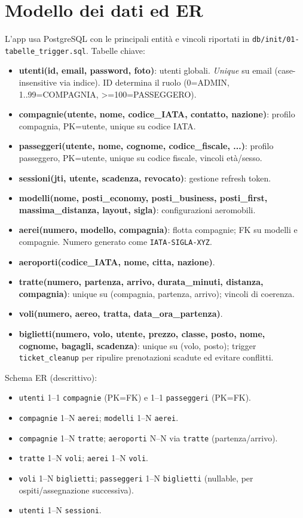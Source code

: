 \documentclass[11pt,a4paper]{article}
\begin{document}
\section{Modello dei dati ed ER}
L'app usa PostgreSQL con le principali entità e vincoli riportati in \texttt{db/init/01-tabelle\_trigger.sql}. Tabelle chiave:
\begin{itemize}
  \item \textbf{utenti(id, email, password, foto)}: utenti globali. \emph{Unique} su email (case-insensitive via indice). ID determina il ruolo (0=ADMIN, 1..99=COMPAGNIA, >=100=PASSEGGERO).
  \item \textbf{compagnie(utente, nome, codice\_IATA, contatto, nazione)}: profilo compagnia, PK=utente, unique su codice IATA.
  \item \textbf{passeggeri(utente, nome, cognome, codice\_fiscale, ...)}: profilo passeggero, PK=utente, unique su codice fiscale, vincoli età/sesso.
  \item \textbf{sessioni(jti, utente, scadenza, revocato)}: gestione refresh token.
  \item \textbf{modelli(nome, posti\_economy, posti\_business, posti\_first, massima\_distanza, layout, sigla)}: configurazioni aeromobili.
  \item \textbf{aerei(numero, modello, compagnia)}: flotta compagnie; FK su modelli e compagnie. Numero generato come \texttt{IATA-SIGLA-XYZ}.
  \item \textbf{aeroporti(codice\_IATA, nome, citta, nazione)}.
  \item \textbf{tratte(numero, partenza, arrivo, durata\_minuti, distanza, compagnia)}: unique su (compagnia, partenza, arrivo); vincoli di coerenza.
  \item \textbf{voli(numero, aereo, tratta, data\_ora\_partenza)}.
  \item \textbf{biglietti(numero, volo, utente, prezzo, classe, posto, nome, cognome, bagagli, scadenza)}: unique su (volo, posto); trigger \texttt{ticket\_cleanup} per ripulire prenotazioni scadute ed evitare conflitti.
\end{itemize}

Schema ER (descrittivo):
\begin{itemize}
  \item \texttt{utenti} 1--1 \texttt{compagnie} (PK=FK) e 1--1 \texttt{passeggeri} (PK=FK).
  \item \texttt{compagnie} 1--N \texttt{aerei}; \texttt{modelli} 1--N \texttt{aerei}.
  \item \texttt{compagnie} 1--N \texttt{tratte}; \texttt{aeroporti} N--N via \texttt{tratte} (partenza/arrivo).
  \item \texttt{tratte} 1--N \texttt{voli}; \texttt{aerei} 1--N \texttt{voli}.
  \item \texttt{voli} 1--N \texttt{biglietti}; \texttt{passeggeri} 1--N \texttt{biglietti} (nullable, per ospiti/assegnazione successiva).
  \item \texttt{utenti} 1--N \texttt{sessioni}.
\end{itemize}
\end{document}

